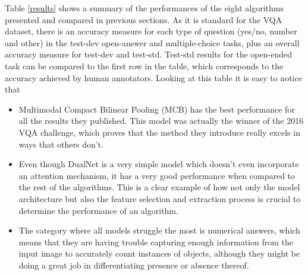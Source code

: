 \documentclass{article}
\begin{document}
Table \ref{results} shows a summary of the performances of the eight algorithms presented and compared in previous sections. As it is standard for the VQA dataset, there is an accuracy measure for each type of question (yes/no, number and other) in the test-dev open-answer and multiple-choice tasks, plus an overall accuracy measure for test-dev and test-std. Test-std results for the open-ended task can be compared to the first row in the table, which corresponds to the accuracy achieved by human annotators. Looking at this table it is easy to notice that
\begin{itemize}
    \item Multimodal Compact Bilinear Pooling (MCB) \citep{corrFukui16} has the best performance for all the results they published. This model was actually the winner of the 2016 VQA challenge, which proves that the method they introduce really excels in ways that others don't.
    \item Even though DualNet \citep{corrSaito16} is a very simple model which doesn't even incorporate an attention mechanism, it has a very good performance when compared to the rest of the algorithms. This is a clear example of how not only the model architecture but also the feature selection and extraction process is crucial to determine the performance of an algorithm.
    \item The category where all models struggle the most is numerical answers, which means that they are having trouble capturing enough information from the input image to accurately count instances of objects, although they might be doing a great job in differentiating presence or absence thereof.
\end{itemize}
\end{document}
